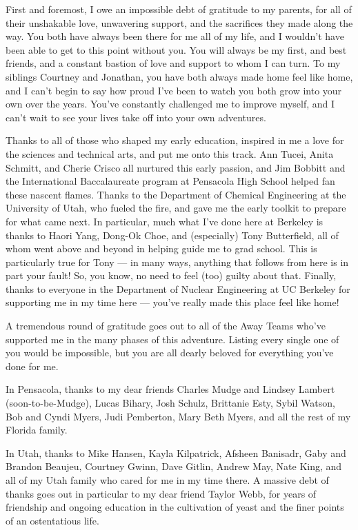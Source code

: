 \documentclass[
]{ucbthesis}
\begin{document}
\begin{frontmatter}
\begin{acknowledgements}
First and foremost, I owe an impossible debt of gratitude to my parents, for all of their unshakable love, unwavering support, and the sacrifices they made along the way. 
You both have always been there for me all of my life, and I wouldn't have been able to get to this point without you.
You will always be my first, and best friends, and a constant bastion of love and support to whom I can turn.
To my siblings Courtney and Jonathan, you have both always made home feel like home, and I can't begin to say how proud I've been to watch you both grow into your own over the years.
You've constantly challenged me to improve myself, and I can't wait to see your lives take off into your own adventures.





Thanks to all of those who shaped my early education, inspired in me a love for the sciences and technical arts, and put me onto this track.
Ann Tucei, Anita Schmitt, and Cherie Crisco all nurtured this early passion, and Jim Bobbitt and the International Baccalaureate program at Pensacola High School helped fan these nascent flames.
Thanks to the Department of Chemical Engineering at the University of Utah, who fueled the fire, and gave me the early toolkit to prepare for what came next.
In particular, much what I've done here at Berkeley is thanks to Haori Yang, Dong-Ok Choe, and (especially) Tony Butterfield, all of whom went above and beyond in helping guide me to grad school.
This is particularly true for Tony --- in many ways, anything that follows from here is in part your fault!
So, you know, no need to feel (too) guilty about that.
Finally, thanks to everyone in the Department of Nuclear Engineering at UC Berkeley for supporting me in my time here --- you've really made this place feel like home!


A tremendous round of gratitude goes out to all of the Away Teams who've supported me in the many phases of this adventure. 
Listing every single one of you would be impossible, but you are all dearly beloved for everything you've done for me.

In Pensacola, thanks to my dear friends Charles Mudge and Lindsey Lambert (soon-to-be-Mudge), Lucas Bihary, Josh Schulz, Brittanie Esty, Sybil Watson, Bob and Cyndi Myers, Judi Pemberton, Mary Beth Myers,   and all the rest of my Florida family.


In Utah, thanks to Mike Hansen, Kayla Kilpatrick, Afsheen Banisadr, Gaby and Brandon Beaujeu, Courtney Gwinn, Dave Gitlin, Andrew May, Nate King, and all of my Utah family who cared for me in my time there.
A massive debt of thanks goes out in particular to my dear friend Taylor Webb, for years of friendship and ongoing education in the cultivation of yeast and the finer points of an ostentatious life.



\end{acknowledgements}
\end{frontmatter}
\end{document}
